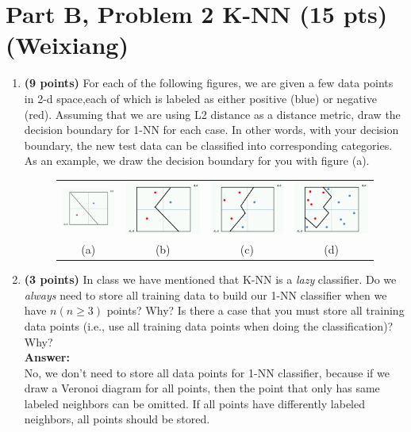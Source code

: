 
\section*{Part B, Problem 2 K-NN (15 pts) (Weixiang)}
\begin{enumerate}
	\item \textbf{(9 points)}
	For each of the following figures, we are given a few data points in
	2-d space,each of which is labeled as either positive (blue) or
	negative (red). Assuming that we are using L2 distance as a distance
	metric, draw the decision boundary for 1-NN for each case. In other words, with your decision boundary, the new test data can be classified into corresponding categories. As an example, we draw the decision boundary for you with figure (a).
	
	\begin{figure}[h!]
		\centering
		\begin{tabular}{cccc}
			\includegraphics[width=.25\columnwidth]{pa.png}& \includegraphics[width=.25\columnwidth]{pb.png}& \includegraphics[width=.25\columnwidth]{pc.png}&
			\includegraphics[width=.25\columnwidth]{pd.png}\\
			(a) & (b) & (c) & (d)
		\end{tabular}
	\end{figure}
	
	
	\item \textbf{(3 points)} In class we have mentioned that K-NN is a \emph{lazy}
	classifier. Do we \emph{always} need to store all training data to build our 1-NN classifier when we have $n (n\geq3)$ points? Why? Is there a case that you must store all training data points (i.e., use all training data points when doing the classification)? Why?
	\\\textbf{Answer:}\\
	No, we don't need to store all data points for 1-NN classifier, because if we draw a Veronoi diagram for all points, then the point that only has same labeled neighbors can be omitted. If all points have differently labeled neighbors, all points should be stored. 
	

\end{enumerate}
